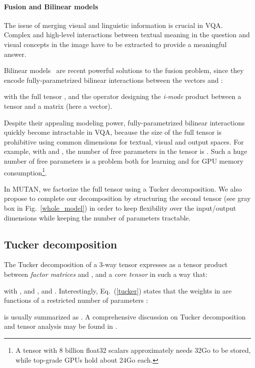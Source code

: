 \documentclass[10pt,twocolumn,letterpaper]{article}
\begin{document}
\paragraph{Fusion and Bilinear models}
The issue of merging visual and linguistic information is crucial in VQA. Complex and 
high-level interactions between textual meaning in the question and visual concepts in the image have to be extracted to provide a meaningful answer. 

Bilinear models~\cite{fukui16mcb,Kim2017} are recent powerful solutions to the fusion problem, since they encode fully-parametrized bilinear interactions between the vectors  and : 


with the full tensor , and the operator  designing the \emph{i-mode} product between a tensor and a matrix (here a vector). 

Despite their appealing modeling power, fully-parametrized bilinear interactions quickly become intractable in VQA, because the size of the full tensor is  
prohibitive using common dimensions for textual, visual and output spaces. 
For example, with  and , the number of free parameters in the tensor  is .
Such a huge number of free parameters is a problem both for learning and for GPU memory consumption\footnote{A tensor with 8 billion float32 scalars approximately needs 32Go to be stored, while top-grade GPUs hold about 24Go each.}. 

 In MUTAN, we factorize the full tensor  using a Tucker decomposition. 
We also propose to complete our decomposition by structuring the second tensor  (see gray box in Fig.~\ref{whole_model}) in order to keep flexibility over the input/output dimensions while keeping the number of parameters tractable.

\label{bilinear_pb}
\subsection{Tucker decomposition}
The Tucker decomposition \cite{Tucker1966} of a 3-way tensor  expresses  as a tensor product between \emph{factor matrices}  and , and a \emph{core tensor}  in such a way that:

with ,  and , and . Interestingly, Eq.~(\ref{tucker}) states that the weights in  are functions of a restricted number of parameters :
\vspace*{-0.3cm}

 is usually summarized as .
A comprehensive discussion on Tucker decomposition and tensor analysis may be found in \cite{Kolda:2009:TDA:1655228.1655230}.
\end{document}
